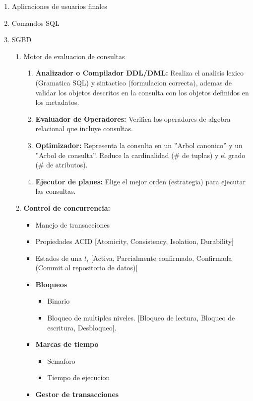 \documentclass[twoside]{article}
\begin{document}
\begin{enumerate}
  \item Aplicaciones de usuarios finales
  \item Comandos SQL
  \item SGBD
  \begin{enumerate}
    \item Motor de evaluacion de consultas
    \begin{enumerate}
      \item \textbf{Analizador o Compilador DDL/DML:} Realiza el analisis lexico (Gramatica SQL) y sintactico (formulacion correcta), ademas de validar los objetos descritos en la consulta con los objetos definidos en los metadatos.
      \item \textbf{Evaluador de Operadores:} Verifica los operadores de algebra relacional que incluye consultas.
      \item \textbf{Optimizador:} Representa la consulta en un ''Arbol canonico'' y un ''Arbol de consulta''. Reduce la cardinalidad (# de tuplas) y el grado (# de atributos).
      \item \textbf{Ejecutor de planes:} Elige el mejor orden (estrategia) para ejecutar las consultas.
    \end{enumerate}
    \item \textbf{Control de concurrencia:}
    \begin{itemize}
      \item Manejo de transacciones
      \item Propiedades ACID [Atomicity, Consistency, Isolation, Durability]
      \item Estados de una $t_i$ [Activa, Parcialmente confirmado, Confirmada (Commit al repositorio de datos)]
      \item \textbf{Bloqueos}
      \begin{itemize}
        \item Binario
        \item Bloqueo de multiples niveles. [Bloqueo de lectura, Bloqueo de escritura, Desbloqueo].
      \end{itemize}
      \item \textbf{Marcas de tiempo}
      \begin{itemize}
        \item Semaforo
        \item Tiempo de ejecucion
      \end{itemize}
    \item \textbf{Gestor de transacciones}

\end{itemize}
\end{enumerate}
\end{enumerate}
\end{document}
